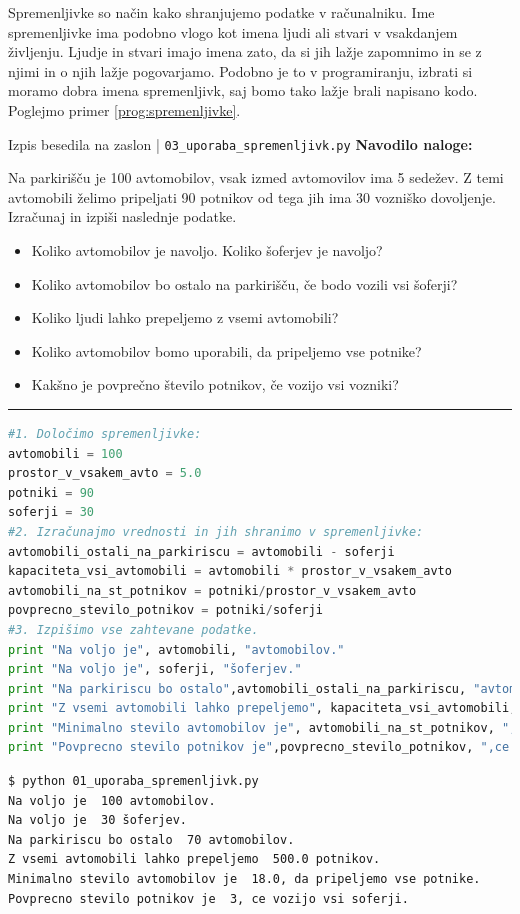 Spremenljivke so način kako shranjujemo podatke v računalniku.  Ime
spremenljivke ima podobno vlogo kot imena ljudi ali stvari v
vsakdanjem življenju. Ljudje in stvari imajo imena zato, da si jih
lažje zapomnimo in se z njimi in o njih lažje pogovarjamo. Podobno je
to v programiranju, izbrati si moramo dobra imena spremenljivk, saj
bomo tako lažje brali napisano kodo. Poglejmo primer
\ref{prog:spremenljivke}.

\begin{examplebox}[label={prog:spremenljivke}]{Izpis besedila na
    zaslon | \texttt{03\_uporaba\_spremenljivk.py} \cite{web:PTHardWay}}
\textbf{Navodilo naloge:}

Na parkirišču je 100 avtomobilov, vsak izmed avtomovilov ima 5
sedežev. Z temi avtomobili želimo pripeljati 90 potnikov od tega jih
ima 30 vozniško dovoljenje. Izračunaj in izpiši naslednje podatke.
\begin{itemize}
\item Koliko avtomobilov je navoljo.  Koliko šoferjev je navoljo?
\item Koliko avtomobilov bo ostalo na parkirišču, če bodo vozili vsi
  šoferji?
\item Koliko ljudi lahko prepeljemo z vsemi avtomobili?
\item Koliko avtomobilov bomo uporabili, da pripeljemo vse potnike?
\item Kakšno je povprečno število potnikov, če vozijo vsi vozniki?
\end{itemize}
\rule{\textwidth}{.4pt}
\begin{lstlisting}[language=Python]
#1. Določimo spremenljivke:
avtomobili = 100
prostor_v_vsakem_avto = 5.0
potniki = 90
soferji = 30
#2. Izračunajmo vrednosti in jih shranimo v spremenljivke:
avtomobili_ostali_na_parkiriscu = avtomobili - soferji
kapaciteta_vsi_avtomobili = avtomobili * prostor_v_vsakem_avto
avtomobili_na_st_potnikov = potniki/prostor_v_vsakem_avto
povprecno_stevilo_potnikov = potniki/soferji
#3. Izpišimo vse zahtevane podatke.
print "Na voljo je", avtomobili, "avtomobilov."
print "Na voljo je", soferji, "šoferjev."
print "Na parkiriscu bo ostalo",avtomobili_ostali_na_parkiriscu, "avtomobilov."
print "Z vsemi avtomobili lahko prepeljemo", kapaciteta_vsi_avtomobili, "potnikov."
print "Minimalno stevilo avtomobilov je", avtomobili_na_st_potnikov, ",da pripeljemo vse potnike."
print "Povprecno stevilo potnikov je",povprecno_stevilo_potnikov, ",ce vozijo vsi soferji."
\end{lstlisting}
\tcblower
\begin{Verbatim}[fontsize=\footnotesize]
$ python 01_uporaba_spremenljivk.py
Na voljo je  100 avtomobilov.
Na voljo je  30 šoferjev.
Na parkiriscu bo ostalo  70 avtomobilov.
Z vsemi avtomobili lahko prepeljemo  500.0 potnikov.
Minimalno stevilo avtomobilov je  18.0, da pripeljemo vse potnike.
Povprecno stevilo potnikov je  3, ce vozijo vsi soferji.
\end{Verbatim}
\end{examplebox}



